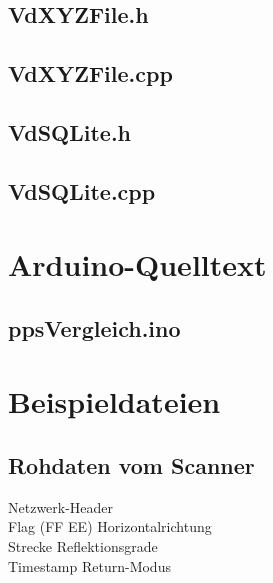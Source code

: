 \documentclass[a4paper,12pt,bibliography=totoc, listof=totoc,titlepage,pointlessnumbers]{scrreprt}
\begin{document}
\begin{appendices}
\section{VdXYZFile.h}
\label{a:VdXYZFile.h}


\section{VdXYZFile.cpp}
\label{a:VdXYZFile.cpp}


\section{VdSQLite.h}
\label{a:VdSQLite.h}


\section{VdSQLite.cpp}
\label{a:VdSQLite.cpp}


\chapter{Arduino-Quelltext}
\section{ppsVergleich.ino}
\label{a:ppsVergleich.ino}


\chapter{Beispieldateien}

\section{Rohdaten vom Scanner}
\label{a:Rohdaten}

{\color{gray} Netzwerk-Header}\\
{\color{red} Flag (FF EE)} {\color{green} Horizontalrichtung}\\
{\color{blue} Strecke} {\color{orange} Reflektionsgrade\\
{\color{yellow} Timestamp } {\color{violet} Return-Modus}\\
\\

}
\end{appendices}
\end{document}
